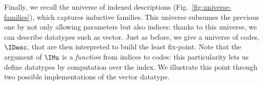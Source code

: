 \documentclass{scrartcl}
\theoremstyle{plain}
\theoremstyle{definition}
\begin{document}
Finally, we recall the universe of indexed descriptions
(Fig.~\ref{fig:universe-families}), which captures inductive
families. This universe subsumes the previous one by not only allowing
parameters but also indices: thanks to this universe, we can describe
datatypes such as vector. Just as before, we give a universe of codes,
\(\IDesc\), that are then interpreted to build the least
fix-point. Note that the argument of \(\IMu\) is a \emph{function}
from indices to codes: this particularity lets us define datatypes by
computation over the index. We illustrate this point through two
possible implementations of the vector datatype.

\renewcommand{\InterpretIDescDef}{
\Code{
  \Let{\InterpretIDesc{\PiTel{\Var{D}}{\IDesc[\Var{I}]}} & 
              \PiTel{\Var{X}}{\Var{I} \To \Set}}
      {\Set}{}\\
\Case{
\Return{\InterpretIDesc{\DVar[\Var{i}]} & \Var{X}}{\Var{X}\: \Var{i}}
\Return{\InterpretIDesc{\DUnit} & \Var{X}}{\Unit}
\Return{\InterpretIDesc{\Var{A} \DTimes \Var{B}} & \Var{X}}
       {\InterpretIDesc{\Var{A}}[\Var{X}] \Times \InterpretIDesc{\Var{B}}[\Var{X}]}
\Return{\InterpretIDesc{\DPi[\Var{S}\: \Var{T}]} & \Var{X}}{\PiTo{\Var{s}}{\Var{S}}{\InterpretIDesc{\Var{T}\: \Var{s}}[\Var{X}]}}
\Return{\InterpretIDesc{\DSigma[\Var{S}\: \Var{T}]} & \Var{X}}{\SigmaTimes{\Var{s}}{\Var{S}}{\InterpretIDesc{\Var{T}\: \Var{s}}[\Var{X}]}}
\Return{\InterpretIDesc{\Dsigma[\Var{E}\: \Var{T}]} & \Var{X}}
       {\SigmaTimes{\Var{e}}{\EnumT[\Var{E}]}
                   {\InterpretIDesc{\Var{T}\: \Var{e}}[\Var{X}]}}
}}}
\end{document}
